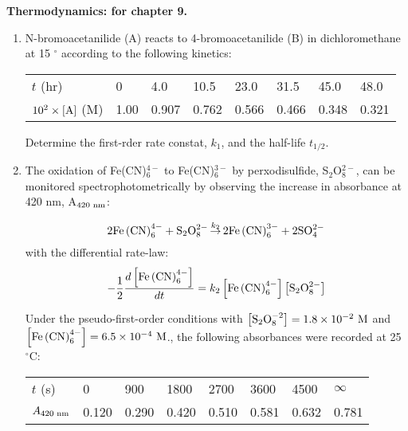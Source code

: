 \newcommand{\omark}[2]{\mathop {#1}\limits^{#2}}
\newcommand{\bmark}[3]{\mathop {#1}\limits^{#2}_{#3}}

\noindent
\textbf{Thermodynamics:
 for chapter 9.}\\

\begin{enumerate}

\item N-bromoacetanilide (A) reacts to 4-bromoacetanilide (B) in dichloromethane at 15 $^\circ$ according to the following kinetics:

\begin{tabular}{llllllll}
$t$ (hr) & 0 & 4.0 & 10.5 & 23.0 & 31.5 & 45.0 & 48.0\\
$10^2\times\left[\textnormal{A}\right]$ (M) & 1.00 & 0.907 & 0.762 & 0.566 & 0.466 & 0.348 & 0.321\\
\end{tabular}

\noindent
Determine the first-rder rate constat, $k_1$, and the half-life $t_{1/2}$.\\


\item The oxidation of Fe(CN)$_6^{4-}$ to Fe(CN)$_6^{3-}$ by perxodisulfide, S$_2$O$_8^{2-}$, can be monitored spectrophotometrically by observing the increase in absorbance at 420 nm, A$_{420\textnormal{ nm}}$:

$$2\textnormal{Fe}\left(\textnormal{CN}\right)_6^{4-} + \textnormal{S}_2\textnormal{O}_8^{2-} \omark{\rightarrow}{k_2} 2\textnormal{Fe}\left(\textnormal{CN}\right)_6^{3-} + 2\textnormal{SO}_4^{2-}$$
with the differential rate-law:
$$-\frac{1}{2}\frac{d\left[\textnormal{Fe}\left(\textnormal{CN}\right)_6^{4-}\right]}{dt} = k_2\left[\textnormal{Fe}\left(\textnormal{CN}\right)_6^{4-}\right]\left[\textnormal{S}_2\textnormal{O}_8^{2-}\right]$$

\noindent
Under the pseudo-first-order conditions with $\left[\textnormal{S}_2\textnormal{O}_8^{-2}\right] = 1.8\times 10^{-2}\textnormal{ M}$ and $\left[\textnormal{Fe}\left(\textnormal{CN}\right)_6^{4-}\right] = 6.5\times 10^{-4}\textnormal{ M}$., the following absorbances were recorded at 25 $^\circ$C:

\begin{tabular}{llllllll}
$t$ (s) & 0 & 900 & 1800 & 2700 & 3600 & 4500 & $\infty$\\
$A_{420\textnormal{ nm}}$ & 0.120 & 0.290 & 0.420 & 0.510 & 0.581 & 0.632 & 0.781\\
\end{tabular}


\end{enumerate}
